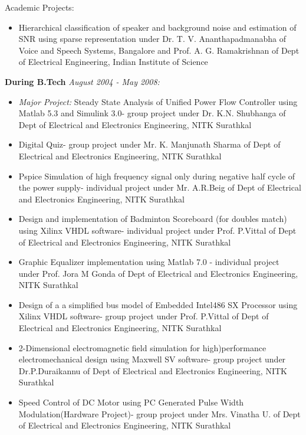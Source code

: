 \documentclass[10pt]{article}
\begin{document}
\begin{cv}
\begin{cvlist}{Academic Projects:}
\begin{itemize}
\item Hierarchical classification of speaker and background noise and estimation of SNR using sparse representation under Dr. T. V. Ananthapadmanabha of Voice and Speech Systems, Bangalore and Prof. A. G. Ramakrishnan of Dept of Electrical Engineering, Indian Institute of Science
	\end{itemize}

\item \textbf{ During B.Tech} \textit{August 2004 - May 2008:}
\begin{itemize}\itemsep=0.25em
	\item \textit{Major Project:} Steady State Analysis of Unified Power Flow Controller using Matlab 5.3 and
Simulink 3.0- group project under Dr. K.N. Shubhanga of Dept of Electrical and
Electronics Engineering, NITK Surathkal

\item
Digital Quiz- group project under Mr. K. Manjunath
Sharma of Dept of Electrical and Electronics
Engineering, NITK Surathkal
\item

Pspice Simulation of high frequency signal only during
negative half cycle of the power supply- individual
project under Mr. A.R.Beig of Dept of Electrical and
Electronics Engineering, NITK Surathkal

\item
Design and implementation of Badminton Scoreboard (for
doubles match) using Xilinx VHDL software- individual project
under Prof. P.Vittal of Dept of Electrical and
Electronics Engineering, NITK Surathkal

\item
Graphic Equalizer implementation using Matlab 7.0
- individual project under Prof. Jora M Gonda of Dept of
Electrical and Electronics Engineering, NITK Surathkal

\item
Design of a a simplified bus model of Embedded
Intel486 SX Processor using Xilinx VHDL software- group
project under Prof. P.Vittal of Dept of Electrical
and Electronics Engineering, NITK Surathkal

\item
2-Dimensional electromagnetic field simulation for
high)performance electromechanical design using Maxwell
SV software- group project under Dr.P.Duraikannu
of Dept of Electrical and Electronics Engineering,
NITK Surathkal

\item
Speed Control of DC Motor using PC Generated Pulse Width
Modulation(Hardware Project)- group project under Mrs. Vinatha U. of
Dept of Electrical and Electronics Engineering, NITK
Surathkal


\end{itemize}
\end{cvlist}
\end{cv}
\end{document}
